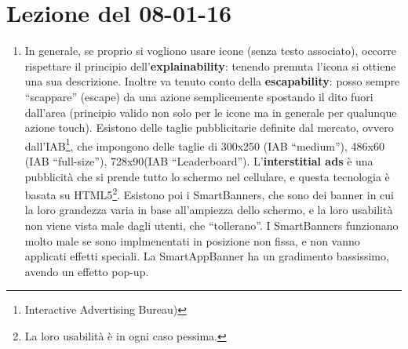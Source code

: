 \section{Lezione del 08-01-16}

\begin{enumerate}

\item[]In generale, se proprio si vogliono usare icone (senza testo associato), occorre rispettare il principio dell'\textbf{explainability}: tenendo premuta l'icona si ottiene una sua descrizione. Inoltre va tenuto conto della \textbf{escapability}: posso sempre ``scappare'' (escape) da una azione semplicemente spostando il dito fuori dall'area (principio valido non solo per le icone ma in generale per qualunque azione touch).
Esistono delle taglie pubblicitarie definite dal mercato, ovvero dall'IAB\footnote{Interactive Advertising Bureau)}, che impongono delle taglie di 300x250 (IAB ``medium''), 486x60 (IAB ``full-size''), 728x90(IAB ``Leaderboard''). L'\textbf{interstitial ads} \`e una pubblicit\`a che si prende tutto lo schermo nel cellulare, e questa tecnologia \`e basata su HTML5\footnote{La loro usabilit\`a \`e in ogni caso pessima.}. Esistono poi i SmartBanners, che sono dei banner in cui la loro grandezza varia in base all'ampiezza dello schermo, e la loro usabilit\`a non viene vista male dagli utenti, che ``tollerano''. I SmartBanners funzionano molto male se sono implmenentati in posizione non fissa, e non vanno applicati effetti speciali. La SmartAppBanner ha un gradimento bassissimo, avendo un effetto pop-up.


\end{enumerate}
